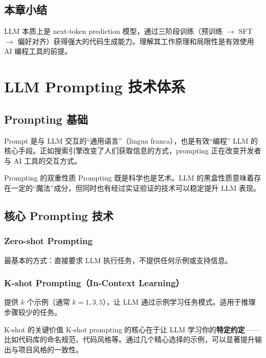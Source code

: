 \documentclass[a4paper]{article}
\begin{document}
\subsection{本章小结}

LLM 本质上是 next-token prediction 模型，通过三阶段训练（预训练 $\rightarrow$ SFT $\rightarrow$ 偏好对齐）获得强大的代码生成能力。理解其工作原理和局限性是有效使用 AI 编程工具的前提。

\section{LLM Prompting 技术体系}

\subsection{Prompting 基础}

Prompt 是与 LLM 交互的``通用语言''（lingua franca），也是有效``编程'' LLM 的核心手段。正如搜索引擎改变了人们获取信息的方式，prompting 正在改变开发者与 AI 工具的交互方式。

\begin{knowledgebox}{Prompting 的双重性质}
Prompting 既是科学也是艺术。LLM 的黑盒性质意味着存在一定的``魔法''成分，但同时也有经过实证验证的技术可以稳定提升 LLM 表现。
\end{knowledgebox}

\subsection{核心 Prompting 技术}

\subsubsection{Zero-shot Prompting}

最基本的方式：直接要求 LLM 执行任务，不提供任何示例或支持信息。

\subsubsection{K-shot Prompting（In-Context Learning）}

提供 $k$ 个示例（通常 $k = 1, 3, 5$），让 LLM 通过示例学习任务模式。适用于推理步骤较少的任务。

\begin{importantbox}{K-shot 的关键价值}
K-shot prompting 的核心在于让 LLM 学习你的\textbf{特定约定}——比如代码库的命名规范、代码风格等。通过几个精心选择的示例，可以显著提升输出与项目风格的一致性。
\end{importantbox}
\end{document}
